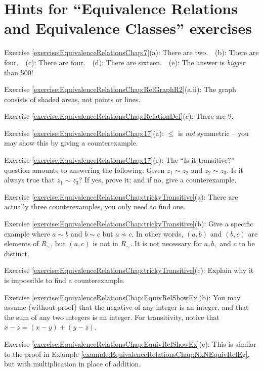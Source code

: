 \section{Hints for ``Equivalence Relations and Equivalence Classes'' exercises}\label{secEqRelChapHints} 

\noindent Exercise \ref{exercise:EquivalenceRelationsChap:7}(a): There are two.~~(b): There are four.~~(c): There are four.~~(d): There are sixteen.~~(e): The answer is \emph{bigger} than 500!

\noindent Exercise \ref{exercise:EquivalenceRelationsChap:RelGraphR2}(a.ii): The graph consists of shaded areas, not points or lines.

\noindent Exercise \ref{exercise:EquivalenceRelationsChap:RelationDef}(c): There are 9.

\noindent Exercise \ref{exercise:EquivalenceRelationsChap:17}(a): $\leq$ is \emph{not} symmetric -- you may show this by giving a counterexample.

\noindent Exercise \ref{exercise:EquivalenceRelationsChap:17}(c): The ``Is it transitive?'' question amounts to answering the following:  Given $z_1 \sim z_2$ and $z_2 \sim z_3$.  Is it always true that $z_1 \sim z_3$?  If yes, prove it; and if no, give a counterexample. 

\noindent Exercise \ref{exercise:EquivalenceRelationsChap:trickyTransitive}(a): There are actually three counterexamples, you only need to find one.

\noindent Exercise \ref{exercise:EquivalenceRelationsChap:trickyTransitive}(b): Give a specific example where $a \sim b$ and $b \sim c$ but $a \not\sim c$.  In other words, $(a,b)$ and $(b,c)$ are elements of $R_{\sim}$, but $(a,c)$ is not in  $R_{\sim}$. It is not necessary for $a,b,$ and $c$ to be distinct.

\noindent Exercise \ref{exercise:EquivalenceRelationsChap:trickyTransitive}(c): Explain why it is impossible to find a counterexample.

\noindent Exercise \ref{exercise:EquivalenceRelationsChap:EquivRelShowEx}(b): You may assume (without proof) that the negative of any integer is an integer, and that the sum of any two integers is an integer. For transitivity, notice that $x - z = (x - y) + (y - z)$.

\noindent Exercise \ref{exercise:EquivalenceRelationsChap:EquivRelShowEx}(c): This is similar to the proof in Example \ref{example:EquivalenceRelationsChap:NxNEquivRelEg}, but with multiplication in place of addition.

